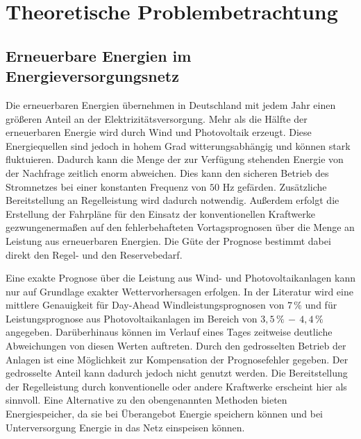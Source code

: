 \chapter{Theoretische Problembetrachtung}
\label{chap:theorie}
\minitoc


\section{Erneuerbare Energien im Energieversorgungsnetz}

Die erneuerbaren Energien \"ubernehmen in Deutschland mit jedem Jahr einen
gr\"o\ss eren Anteil an der Elektrizit\"atsversorgung. Mehr als die H\"alfte
der erneuerbaren Energie wird durch Wind und
Photovoltaik erzeugt. Diese Energiequellen sind jedoch in hohem Grad
witterungsabh\"angig und k\"onnen stark fluktuieren. Dadurch kann die Menge der
zur Verf\"ugung stehenden Energie von der Nachfrage zeitlich enorm abweichen.
Dies kann den  sicheren Betrieb des Stromnetzes bei einer konstanten Frequenz
von $50$ Hz gef\"arden. Zus\"atzliche Bereitstellung an Regelleistung wird
dadurch notwendig. Au\ss erdem erfolgt die Erstellung der Fahrpl\"ane f\"ur
den Einsatz der konventionellen Kraftwerke gezwungenerma\ss en auf den
fehlerbehafteten Vortagsprognosen \"uber die Menge an Leistung aus erneuerbaren
Energien. Die G\"ute der Prognose bestimmt dabei direkt den Regel- und den
Reservebedarf.

Eine exakte Prognose \"uber die Leistung aus Wind- und Photovoltaikanlagen kann
nur auf Grundlage exakter Wettervorhersagen erfolgen. In der Literatur wird eine
mittlere Genauigkeit f\"ur Day-Ahead Windleistungsprognosen von $7\,\%$
\cite{prognose_doctor} und f\"ur Leistungsprognose aus Photovoltaikanlagen im
Bereich von $3,5\,\%\,-\,4,4\,\%$ \cite{solarvorhersagung} angegeben.
Dar\"uberhinaus k\"onnen im Verlauf eines Tages zeitweise deutliche Abweichungen
von diesen Werten auftreten. Durch den gedrosselten Betrieb der Anlagen ist
eine M\"oglichkeit zur Kompensation der Prognosefehler gegeben. Der gedrosselte
Anteil kann dadurch jedoch nicht genutzt werden. Die Bereitstellung der
Regelleistung durch konventionelle oder andere Kraftwerke erscheint hier als
sinnvoll. Eine Alternative zu den obengenannten Methoden bieten Energiespeicher,
da sie bei \"Uberangebot Energie speichern k\"onnen und bei Unterversorgung
Energie in das Netz einspeisen k\"onnen.

